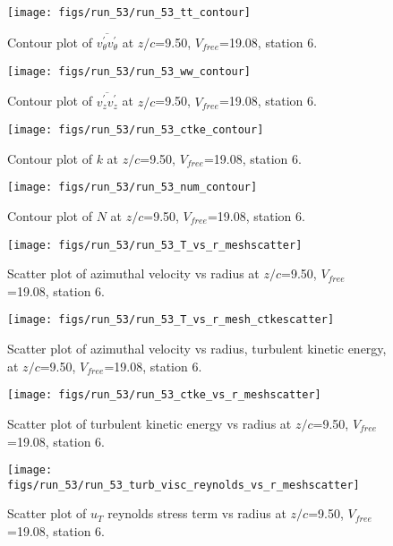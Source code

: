 \begin{figure}[H]
\centering
\texttt{[image: figs/run\_53/run\_53\_tt\_contour]}
\caption{Contour plot of $\overline{v_{\theta}^{\prime} v_{\theta}^{\prime}}$ at $z/c$=9.50, $V_{free}$=19.08, station 6.}
\end{figure}


\begin{figure}[H]
\centering
\texttt{[image: figs/run\_53/run\_53\_ww\_contour]}
\caption{Contour plot of $\overline{v_{z}^{\prime} v_{z}^{\prime}}$ at $z/c$=9.50, $V_{free}$=19.08, station 6.}
\end{figure}


\begin{figure}[H]
\centering
\texttt{[image: figs/run\_53/run\_53\_ctke\_contour]}
\caption{Contour plot of $k$ at $z/c$=9.50, $V_{free}$=19.08, station 6.}
\end{figure}


\begin{figure}[H]
\centering
\texttt{[image: figs/run\_53/run\_53\_num\_contour]}
\caption{Contour plot of $N$ at $z/c$=9.50, $V_{free}$=19.08, station 6.}
\end{figure}


\begin{figure}[H]
\centering
\texttt{[image: figs/run\_53/run\_53\_T\_vs\_r\_meshscatter]}
\caption{Scatter plot of azimuthal velocity vs radius at $z/c$=9.50, $V_{free}$=19.08, station 6.}
\end{figure}


\begin{figure}[H]
\centering
\texttt{[image: figs/run\_53/run\_53\_T\_vs\_r\_mesh\_ctkescatter]}
\caption{Scatter plot of azimuthal velocity vs radius, turbulent kinetic energy, at $z/c$=9.50, $V_{free}$=19.08, station 6.}
\end{figure}


\begin{figure}[H]
\centering
\texttt{[image: figs/run\_53/run\_53\_ctke\_vs\_r\_meshscatter]}
\caption{Scatter plot of turbulent kinetic energy vs radius at $z/c$=9.50, $V_{free}$=19.08, station 6.}
\end{figure}


\begin{figure}[H]
\centering
\texttt{[image: figs/run\_53/run\_53\_turb\_visc\_reynolds\_vs\_r\_meshscatter]}
\caption{Scatter plot of $
u_T$ reynolds stress term vs radius at $z/c$=9.50, $V_{free}$=19.08, station 6.}
\end{figure}


